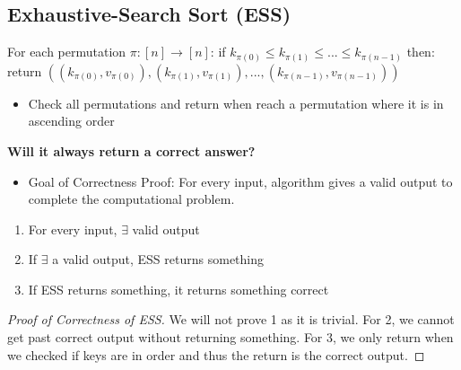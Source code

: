 \documentclass[11pt]{scrartcl}
\theoremstyle{dotlessP}
\theoremstyle{dotlessN}
\begin{document}
\subsection{Exhaustive-Search Sort (ESS)}
For each permutation $\pi: [n] \to [n]$:
	if $k_{\pi(0)} \leq k_{\pi(1)} \leq ... \leq k_{\pi(n-1)}$ then:
		return $((k_{\pi(0)}, v_{\pi(0)}), (k_{\pi(1)},v_{\pi(1)}),...,(k_{\pi(n-1)}, v_{\pi(n-1)}))$
\begin{itemize}
	\item Check all permutations and return when reach a permutation where it is in ascending order
\end{itemize}
\textbf{Will it always return a correct answer?}
\begin{itemize}
	\item Goal of Correctness Proof: For every input, algorithm gives a valid output to complete the computational problem.
\end{itemize}	
\begin{enumerate}
	\item For every input, $\exists$ valid output
	\item If $\exists$ a valid output, ESS returns something
	\item If ESS returns something, it returns something correct
\end{enumerate}
\begin{proof}
	[Proof of Correctness of ESS]
	We will not prove 1 as it is trivial. For 2, we cannot get past correct output without returning something. For 3, we only return when we checked if keys are in order and thus the return is the correct output.
\end{proof}
\end{document}
